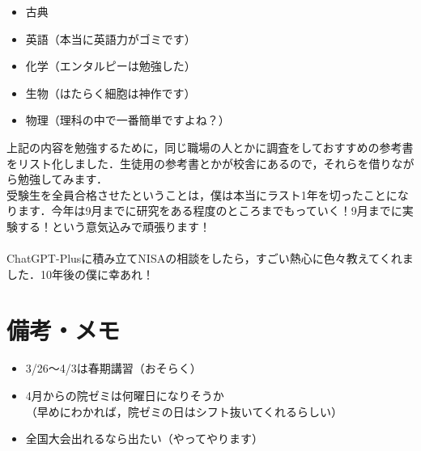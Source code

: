 \documentclass[a4paper,12pt]{ltjsarticle}
\begin{document}
\begin{itemize}
  \item 古典
  \item 英語（本当に英語力がゴミです）
  \item 化学（エンタルピーは勉強した）
  \item 生物（はたらく細胞は神作です）
  \item 物理（理科の中で一番簡単ですよね？）
\end{itemize}

上記の内容を勉強するために，同じ職場の人とかに調査をしておすすめの参考書をリスト化しました．生徒用の参考書とかが校舎にあるので，それらを借りながら勉強してみます．\\

受験生を全員合格させたということは，僕は本当にラスト1年を切ったことになります．今年は9月までに研究をある程度のところまでもっていく！9月までに実験する！という意気込みで頑張ります！\\\\

ChatGPT-Plusに積み立てNISAの相談をしたら，すごい熱心に色々教えてくれました．10年後の僕に幸あれ！
\newpage

\section*{備考・メモ}
\begin{itemize}
  \item 3/26～4/3は春期講習（おそらく）\\
  \item 4月からの院ゼミは何曜日になりそうか\\（早めにわかれば，院ゼミの日はシフト抜いてくれるらしい）\\
  \item 全国大会出れるなら出たい（やってやります）
\end{itemize}
\end{document}
